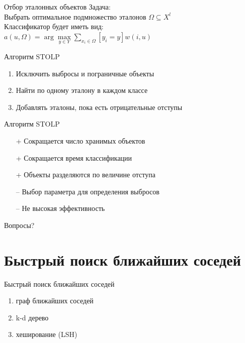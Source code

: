 \documentclass[10pt]{beamer}
\begin{document}
\begin{frame}{Отбор эталонных объектов}
	\alert{Задача}:\\
	Выбрать оптимальное подмножество эталонов $\Omega\subseteq X^l$\\ 
    \bigbreak
	Классификатор будет иметь вид:\\
	${a(u, \Omega) = \arg\max\limits_{y \in Y} \sum\limits_{x_i \in \Omega} [y_i = y]w(i, u) }$\\
\end{frame}

\begin{frame}{Алгоритм STOLP}
	\begin{enumerate}
		\item Исключить выбросы и пограничные объекты
		\item Найти по одному эталону в каждом классе
		\item Добавлять эталоны, пока есть отрицательные отступы	
	\end{enumerate}
\end{frame}

\begin{frame}{Алгоритм STOLP}
	\begin{itemize} [<+- | alert@+>]
	\item[+] Сокращается число хранимых объектов
	\item[+] Сокращается время классификации
	\item[+] Объекты разделяются по величине отступа
	\bigbreak
	\item[--] Выбор параметра для определения выбросов
	\item[--] Не высокая эффективность
	\end{itemize}
\end{frame}

\begin{frame}[standout]
  Вопросы?
\end{frame}

\appendix

\section{Быстрый поиск ближайших соседей}

\begin{frame}{Быстрый поиск ближайших соседей}
	\begin{enumerate} [--]
		\item граф ближайших соседей
		\item k-d дерево
		\item хеширование (LSH)
	\end{enumerate}
\end{frame}
\end{document}

